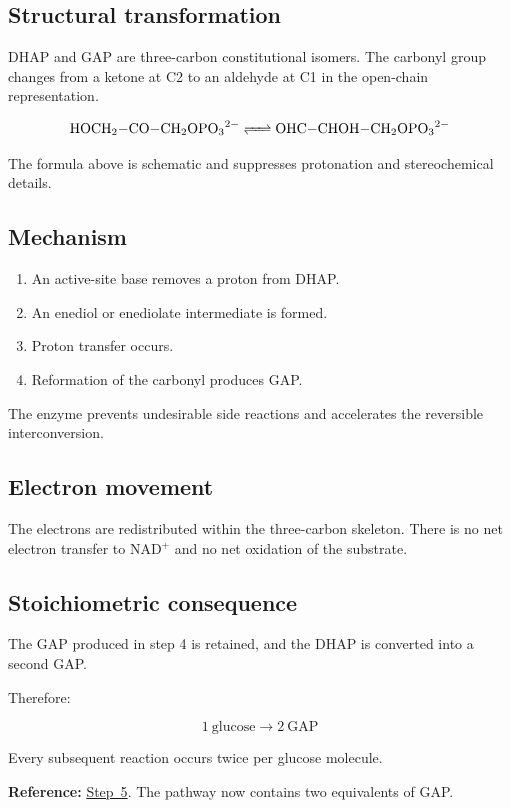 \documentclass[11pt,a4paper]{article}
\newcommand{\stepref}[1]{\hyperref[step:#1]{Step~#1}}
\newcommand{\Note}[1]{\par\smallskip
  \noindent\colorbox{gray!12}{
    \parbox{0.96\linewidth}{#1}
  }\par\smallskip}
\begin{document}
\subsection{Structural transformation}

DHAP and GAP are three-carbon constitutional isomers. The
carbonyl group changes from a ketone at C2 to an aldehyde at C1
in the open-chain representation.

\[
\ce{
HOCH2-CO-CH2OPO3^{2-}
<=> 
OHC-CHOH-CH2OPO3^{2-}
}
\]

The formula above is schematic and suppresses protonation and
stereochemical details.

\subsection{Mechanism}

\begin{enumerate}
  \item An active-site base removes a proton from DHAP.
  \item An enediol or enediolate intermediate is formed.
  \item Proton transfer occurs.
  \item Reformation of the carbonyl produces GAP.
\end{enumerate}

The enzyme prevents undesirable side reactions and accelerates
the reversible interconversion.

\subsection{Electron movement}

The electrons are redistributed within the three-carbon skeleton.
There is no net electron transfer to NAD$^+$ and no net oxidation
of the substrate.

\subsection{Stoichiometric consequence}

The GAP produced in step 4 is retained, and the DHAP is converted
into a second GAP.

Therefore:

\[
\boxed{
1\ \text{glucose} \longrightarrow 2\ \text{GAP}
}
\]

Every subsequent reaction occurs twice per glucose molecule.

\Note{
\textbf{Reference:} \stepref{5}. The pathway now contains two
equivalents of GAP.
}
\end{document}
